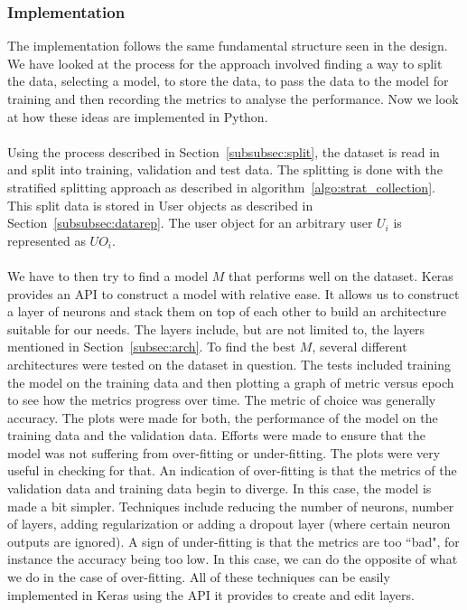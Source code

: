 \documentclass[12pt]{article}
\begin{document}
\subsubsection{Implementation}
The implementation follows the same fundamental structure seen in the design. We have looked at the process for the approach involved finding a way to split the data, selecting a model, to store the data, to pass the data to the model for training and then recording the metrics to analyse the performance. Now we look at how these ideas are implemented in Python. 
\\\\
Using the process described in Section~\ref{subsubsec:split}, the dataset is read in and split into training, validation and test data. The splitting is done with the stratified splitting approach as described in algorithm~\ref{algo:strat_collection}. This split data is stored in User objects as described in Section~\ref{subsubsec:datarep}. The user object for an arbitrary user $U_i$ is represented as $UO_i$.
\\\\
We have to then try to find a model $M$ that performs well on the dataset. Keras provides an API to construct a model with relative ease. It allows us to construct a layer of neurons and stack them on top of each other to build an architecture suitable for our needs. The layers include, but are not limited to, the layers mentioned in Section~\ref{subsec:arch}. To find the best $M$, several different architectures were tested on the dataset in question. The tests included training the model on the training data and then plotting a graph of metric versus epoch to see how the metrics progress over time. The metric of choice was generally accuracy. The plots were made for both, the performance of the model on the training data and the validation data. Efforts were made to ensure that the model was not suffering from over-fitting or under-fitting. The plots were very useful in checking for that. An indication of over-fitting is that the metrics of the validation data and training data begin to diverge. In this case, the model is made a bit simpler. Techniques include reducing the number of neurons, number of layers, adding regularization or adding a dropout layer (where certain neuron outputs are ignored). A sign of under-fitting is that the metrics are too ``bad", for instance the accuracy being too low. In this case, we can do the opposite of what we do in the case of over-fitting. All of these techniques can be easily implemented in Keras using the API it provides to create and edit layers. 
\end{document}
